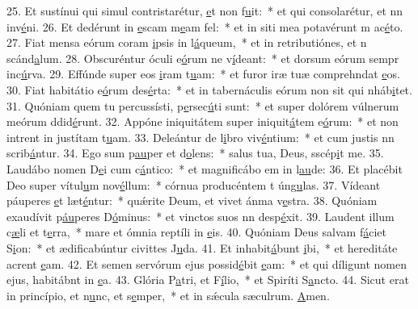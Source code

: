 25. Et sustínui qui simul contristarétur, \uline{e}t non f\uline{u}it:~* et qui consolarétur, et nn inv\uline{é}ni.
26. Et dedérunt in \uline{e}scam m\uline{e}am fel:~* et in siti mea potavérunt m ac\uline{é}to.
27. Fiat mensa eórum coram \uline{i}psis in l\uline{á}queum,~* et in retributiónes, et n scánd\uline{a}lum.
28. Obscuréntur óculi e\uline{ó}rum ne v\uline{í}deant:~* et dorsum eórum sempr inc\uline{ú}rva.
29. Effúnde super eos \uline{i}ram t\uline{u}am:~* et furor iræ tuæ comprehndat \uline{e}os.
30. Fiat habitátio e\uline{ó}rum des\uline{é}rta:~* et in tabernáculis eórum non sit qui nháb\uline{i}tet.
31. Quóniam quem tu percussísti, p\uline{e}rsec\uline{ú}ti sunt:~* et super dolórem vúlnerum meórum ddid\uline{é}runt.
32. Appóne iniquitátem super iniquit\uline{á}tem e\uline{ó}rum:~* et non intrent in justítam t\uline{u}am.
33. Deleántur de l\uline{i}bro viv\uline{é}ntium:~* et cum justis nn scrib\uline{á}ntur.
34. Ego sum p\uline{au}per et d\uline{o}lens:~* salus tua, Deus, sscép\uline{i}t me.
35. Laudábo nomen D\uline{e}i cum c\uline{á}ntico:~* et magnificábo em in l\uline{au}de:
36. Et placébit Deo super vítul\uline{u}m nov\uline{é}llum:~* córnua producéntem t úng\uline{u}las.
37. Vídeant páuperes \uline{e}t læt\uline{é}ntur:~* quǽrite Deum, et vivet ánma v\uline{e}stra.
38. Quóniam exaudívit p\uline{áu}peres D\uline{ó}minus:~* et vinctos suos nn desp\uline{é}xit.
39. Laudent illum c\uline{æ}li et t\uline{e}rra,~* mare et ómnia reptíli in \uline{e}is.
40. Quóniam Deus salvam f\uline{á}ciet S\uline{i}on:~* et ædificabúntur civittes J\uline{u}da.
41. Et inhabit\uline{á}bunt \uline{i}bi,~* et hereditáte acrent \uline{e}am.
42. Et semen servórum ejus possid\uline{é}bit \uline{e}am:~* et qui díligunt nomen ejus, habitábnt in \uline{e}a.
43. Glória P\uline{a}tri, et F\uline{í}lio,~* et Spiríti S\uline{a}ncto.
44. Sicut erat in princípio, et n\uline{u}nc, et s\uline{e}mper,~* et in sǽcula sæculrum. \uline{A}men.
